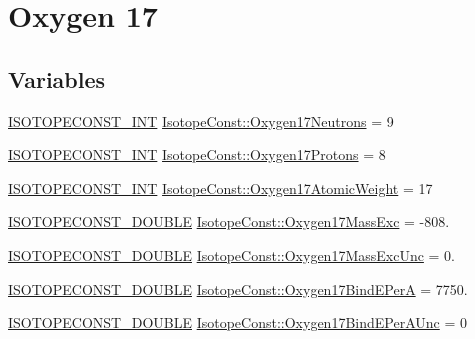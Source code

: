 \hypertarget{group___isotope_const-_oxygen-_o17}{}\section{Oxygen 17}
\label{group___isotope_const-_oxygen-_o17}
\subsection*{Variables}
\begin{DoxyCompactItemize}
\item 
\mbox{\hyperlink{group___isotope_const-_macros_ga5f18360b3e99483a35c32d789e62621c}{I\+S\+O\+T\+O\+P\+E\+C\+O\+N\+S\+T\+\_\+\+I\+NT}} \mbox{\hyperlink{group___isotope_const-_oxygen-_o17_gacf9545a3985f2e6918208695a3dd2e6d}{Isotope\+Const\+::\+Oxygen17\+Neutrons}} = 9
\item 
\mbox{\hyperlink{group___isotope_const-_macros_ga5f18360b3e99483a35c32d789e62621c}{I\+S\+O\+T\+O\+P\+E\+C\+O\+N\+S\+T\+\_\+\+I\+NT}} \mbox{\hyperlink{group___isotope_const-_oxygen-_o17_ga802e4870963b001191df1df92fdbfe28}{Isotope\+Const\+::\+Oxygen17\+Protons}} = 8
\item 
\mbox{\hyperlink{group___isotope_const-_macros_ga5f18360b3e99483a35c32d789e62621c}{I\+S\+O\+T\+O\+P\+E\+C\+O\+N\+S\+T\+\_\+\+I\+NT}} \mbox{\hyperlink{group___isotope_const-_oxygen-_o17_ga2fc69ee6c4214f6d9dd79f46879ff6b5}{Isotope\+Const\+::\+Oxygen17\+Atomic\+Weight}} = 17
\item 
\mbox{\hyperlink{group___isotope_const-_macros_ga8f45a7272ce02c0b4c65c44636ed719a}{I\+S\+O\+T\+O\+P\+E\+C\+O\+N\+S\+T\+\_\+\+D\+O\+U\+B\+LE}} \mbox{\hyperlink{group___isotope_const-_oxygen-_o17_gaef457572328acbb28c7a95d0b29884c8}{Isotope\+Const\+::\+Oxygen17\+Mass\+Exc}} = -\/808.
\item 
\mbox{\hyperlink{group___isotope_const-_macros_ga8f45a7272ce02c0b4c65c44636ed719a}{I\+S\+O\+T\+O\+P\+E\+C\+O\+N\+S\+T\+\_\+\+D\+O\+U\+B\+LE}} \mbox{\hyperlink{group___isotope_const-_oxygen-_o17_ga554d74ffef7744a44732e081c18eb971}{Isotope\+Const\+::\+Oxygen17\+Mass\+Exc\+Unc}} = 0.
\item 
\mbox{\hyperlink{group___isotope_const-_macros_ga8f45a7272ce02c0b4c65c44636ed719a}{I\+S\+O\+T\+O\+P\+E\+C\+O\+N\+S\+T\+\_\+\+D\+O\+U\+B\+LE}} \mbox{\hyperlink{group___isotope_const-_oxygen-_o17_ga20e6ad05eec7debc00d7894dc0f01c96}{Isotope\+Const\+::\+Oxygen17\+Bind\+E\+PerA}} = 7750.
\item 
\mbox{\hyperlink{group___isotope_const-_macros_ga8f45a7272ce02c0b4c65c44636ed719a}{I\+S\+O\+T\+O\+P\+E\+C\+O\+N\+S\+T\+\_\+\+D\+O\+U\+B\+LE}} \mbox{\hyperlink{group___isotope_const-_oxygen-_o17_gae81faae5ce52115baa6297404d7d0a26}{Isotope\+Const\+::\+Oxygen17\+Bind\+E\+Per\+A\+Unc}} = 0

\end{DoxyCompactItemize}
